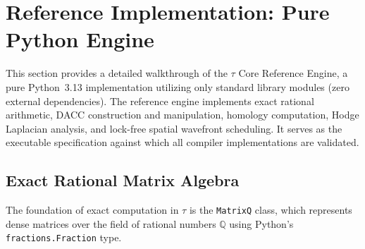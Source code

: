 \documentclass[manuscript, nonacm, review=false]{acmart}
\theoremstyle{definition}
\theoremstyle{plain}
\newcommand{\Q}{\mathbb{Q}}
\newcommand{\toposLang}{\ensuremath{\tau}\text{-Lang}}
\begin{document}

\section{Reference Implementation: Pure Python Engine}
\label{sec:reference_engine}

This section provides a detailed walkthrough of the \toposLang{} Core Reference Engine, a pure Python~3.13 implementation utilizing only standard library modules (zero external dependencies). The reference engine implements exact rational arithmetic, DACC construction and manipulation, homology computation, Hodge Laplacian analysis, and lock-free spatial wavefront scheduling. It serves as the executable specification against which all compiler implementations are validated.

\subsection{Exact Rational Matrix Algebra}
\label{subsec:ref_matrix}

The foundation of exact computation in \toposLang{} is the \texttt{MatrixQ} class, which represents dense matrices over the field of rational numbers $\Q$ using Python's \texttt{fractions.Fraction} type.
\end{document}
